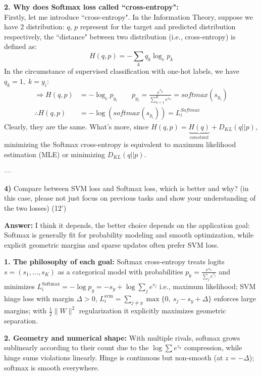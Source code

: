 \documentclass[12pt,a4paper]{article}
\begin{document}
	\textbf{2. Why does Softmax loss called ``cross-entropy":}\\
	Firstly, let me introduce ``cross-entropy". In the Information Theory, suppose we have 2 distribution: $q$, $p$ represent for the target and predicted distribution respectively, the ``distance" between two distribution (i.e., cross-entropy) is defined as:
	\begin{equation}
		H(q,p)=-\sum_k q_k\log_e p_k
	\end{equation}
	In the circumstance of supervised classification with one-hot labels, we have $q_k=1,\; k=y_i$:
	\begin{align}
		\Rightarrow H(q,p)&=-\log_e p_{y_i} \qquad p_{y_i}=\frac{e^{s_{y_i}}}{\sum_{n=1}^K e^{s_n}}=softmax(s_{y_i})
		\\
		\therefore H(q,p)&=-\log(softmax(s_{y_i})) =L_i^{Softmax}
	\end{align}
	Clearly, they are the same. What's more, since $H(q,p)=\underbrace{H(q)}_{constant}+D_{KL}(q||p)$, minimizing the Softmax cross-entropy is equivalent to maximum likelihood estimation (MLE) or minimizing $D_{KL}(q||p)$.

	---
	
	\textbf{4)}  
	Compare between SVM loss and Softmax loss, which is better and why? (in this case, please not just focus on previous tasks and show your understanding of the two losses) (12’)
	
	\textbf{Answer:} I think it depends, the better choice depends on the application goal: Softmax is generally fit for probability modeling and smooth optimization, while explicit geometric margins and sparse updates often prefer SVM loss.
	
	\medskip
	\textbf{1. The philosophy of each goal:}
	Softmax cross-entropy treats logits $s=(s_1,\dots,s_K)$ as a categorical model with probabilities $p_k=\frac{e^{s_k}}{\sum_j e^{s_j}}$ and minimizes $L_i^{\text{Softmax}}=-\log p_y=-s_y+\log\!\sum_{j}e^{s_j}$
	i.e., maximum likelihood; SVM hinge loss with margin $\Delta>0$, $L_i^{\text{svm}}=\sum_{j\neq y}\max\{0,\ s_j-s_y+\Delta\}$ enforces large margins; with $\tfrac12\|W\|^2$ regularization it explicitly maximizes geometric separation.
	
	\medskip
	\textbf{2. Geometry and numerical shape:}
	With multiple rivals, softmax grows sublinearly according to their count due to the $\log\sum e^{z_k}$ compression, while hinge sums violations linearly. 
	Hinge is continuous but non-smooth (at $z=-\Delta$); softmax is smooth everywhere.
	
\end{document}
